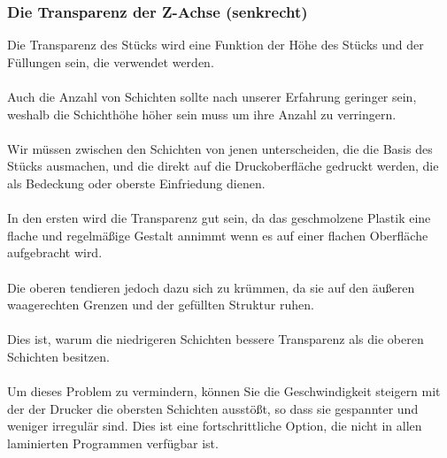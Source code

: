 \documentclass[11pt,a4paper]{article}
\begin{document}
		\subsubsection{Die Transparenz der Z-Achse (senkrecht) }Die Transparenz des Stücks wird eine Funktion der Höhe des Stücks und der Füllungen sein, die verwendet werden. 
\\\\
Auch die Anzahl von Schichten sollte nach unserer Erfahrung geringer sein, weshalb die Schichthöhe höher sein muss um ihre Anzahl zu verringern.
\\\\
Wir müssen zwischen den Schichten von jenen unterscheiden, die die Basis des Stücks ausmachen, und die direkt auf die Druckoberfläche gedruckt werden, die als Bedeckung oder oberste Einfriedung dienen.
\\\\
In den ersten wird die Transparenz gut sein, da das geschmolzene Plastik eine flache und regelmäßige Gestalt annimmt wenn es auf einer flachen Oberfläche aufgebracht wird.
\\\\
Die oberen tendieren jedoch dazu sich zu krümmen, da sie auf den äußeren waagerechten Grenzen und der gefüllten Struktur ruhen.
\\\\
Dies ist, warum die niedrigeren Schichten bessere Transparenz als die oberen Schichten besitzen. 
\\\\
Um dieses Problem zu vermindern, können Sie die Geschwindigkeit steigern mit der der Drucker die obersten Schichten ausstößt, so dass sie gespannter und weniger irregulär sind. Dies ist eine fortschrittliche Option, die nicht in allen laminierten Programmen verfügbar ist. 
\end{document}
